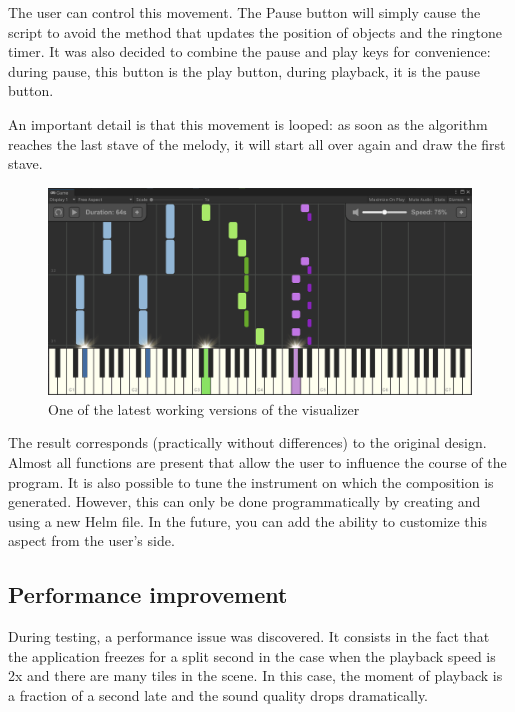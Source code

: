 \documentclass[thesis=B,english]{FITthesis}[2019/12/23]
\begin{document}
The user can control this movement. The Pause button will simply cause the script to avoid the method that updates the position of objects and the ringtone timer. It was also decided to combine the pause and play keys for convenience: during pause, this button is the play button, during playback, it is the pause button.

An important detail is that this movement is looped: as soon as the algorithm reaches the last stave of the melody, it will start all over again and draw the first stave.

\begin{figure}[ht]
            \includegraphics[width=\textwidth]{GamePlay1.png}
            \caption{One of the latest working versions of the visualizer}
            \label{fig:PianoInterface3}
\end{figure}

The result corresponds (practically without differences) to the original design. Almost all functions are present that allow the user to influence the course of the program. It is also possible to tune the instrument on which the composition is generated. However, this can only be done programmatically by creating and using a new Helm file. In the future, you can add the ability to customize this aspect from the user's side.

\subsection{Performance improvement}

During testing, a performance issue was discovered. It consists in the fact that the application freezes for a split second in the case when the playback speed is 2x and there are many tiles in the scene. In this case, the moment of playback is a fraction of a second late and the sound quality drops dramatically.
\end{document}
